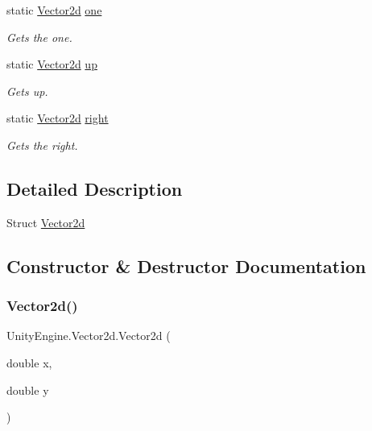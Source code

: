 \begin{DoxyCompactItemize}
static \hyperlink{struct_unity_engine_1_1_vector2d}{Vector2d} \hyperlink{struct_unity_engine_1_1_vector2d_a50114eecef4bf4863037aa91103d5bf9}{one}
\begin{DoxyCompactList}\small\item\em Gets the one. \end{DoxyCompactList}\item 
static \hyperlink{struct_unity_engine_1_1_vector2d}{Vector2d} \hyperlink{struct_unity_engine_1_1_vector2d_a00ee365d7d1fff1d5be6586136a56950}{up}
\begin{DoxyCompactList}\small\item\em Gets up. \end{DoxyCompactList}\item 
static \hyperlink{struct_unity_engine_1_1_vector2d}{Vector2d} \hyperlink{struct_unity_engine_1_1_vector2d_aa4b5fb4bdc71a213383f138ac1eda814}{right}
\begin{DoxyCompactList}\small\item\em Gets the right. \end{DoxyCompactList}\end{DoxyCompactItemize}


\subsection{Detailed Description}
Struct \hyperlink{struct_unity_engine_1_1_vector2d}{Vector2d} 



\subsection{Constructor \& Destructor Documentation}
\mbox{\label{struct_unity_engine_1_1_vector2d_a04f770eca6bf089346578fbe02d2a85d}} 
\subsubsection{\texorpdfstring{Vector2d()}{Vector2d()}}
{\footnotesize\ttfamily Unity\+Engine.\+Vector2d.\+Vector2d (\begin{DoxyParamCaption}\item[{double}]{x,  }\item[{double}]{y }\end{DoxyParamCaption})\hspace{0.3cm}{\ttfamily [inline]}}



